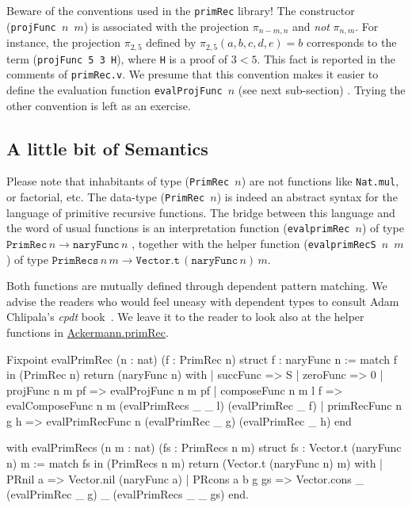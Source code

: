 \begin{remark}
\label{projFunc-order-of-args}
Beware of the conventions used in the \texttt{primRec} library!
The constructor (\texttt{projFunc $n$ $m$})  is associated with the projection $\pi_{n-m,n}$ and \emph{not}
$\pi_{n, m}$.
For instance, the projection $\pi_{2,5}$ defined by $\pi_{2,5}(a,b,c,d,e)=b$ corresponds to the term
(\texttt{projFunc 5 3 H}), where \texttt{H} is a proof of $3<5$.
 This fact is reported in the comments of \texttt{primRec.v}. We presume that this convention makes it easier to define the evaluation function \texttt{evalProjFunc $n$} (see next sub-section) . Trying the other convention is left as an exercise.
\end{remark}



\subsection{A little bit of Semantics} 
Please note that inhabitants of type (\texttt{PrimRec $n$}) are not \coq{} functions like \texttt{Nat.mul}, or factorial, etc. The data-type (\texttt{PrimRec $n$}) is indeed an abstract syntax for the language of primitive recursive functions. The bridge between this language and the word of usual functions
is an interpretation function (\texttt{evalprimRec $n$})  of type
$\texttt{PrimRec}\,n \rightarrow  \texttt{naryFunc}\,n$ , together with the helper function 
(\texttt{evalprimRecS $n$ $m$}) of type 
$\texttt{PrimRecs}\,n\,m \rightarrow  \texttt{Vector.t}\,(\texttt{naryFunc}\,n)\,m$.


Both functions are mutually defined through dependent pattern matching. We advise the readers who 
would feel uneasy with dependent types to consult Adam Chlipala's \emph{cpdt}  book~\cite{chlipalacpdt2011}. We leave it to the reader  to look also at the helper functions in
\href{../theories/html/hydras.Ackermann.primRec.html}{Ackermann.primRec}.


\begin{Coqsrc}
Fixpoint evalPrimRec (n : nat) (f : PrimRec n) {struct f} : 
 naryFunc n :=
  match f in (PrimRec n) return (naryFunc n) with
  | succFunc => S
  | zeroFunc => 0
  | projFunc n m pf => evalProjFunc n m pf
  | composeFunc n m l f =>
      evalComposeFunc n m (evalPrimRecs _ _ l) (evalPrimRec _ f)
  | primRecFunc n g h =>
      evalPrimRecFunc n (evalPrimRec _ g) (evalPrimRec _ h)
  end
 
 with evalPrimRecs (n m : nat) (fs : PrimRecs n m) {struct fs} :
 Vector.t (naryFunc n) m :=
  match fs in (PrimRecs n m) return (Vector.t (naryFunc n) m) with
  | PRnil a => Vector.nil  (naryFunc a)
  | PRcons a b g gs =>
       Vector.cons _ (evalPrimRec _ g) _  (evalPrimRecs _ _ gs)
  end.
\end{Coqsrc}

